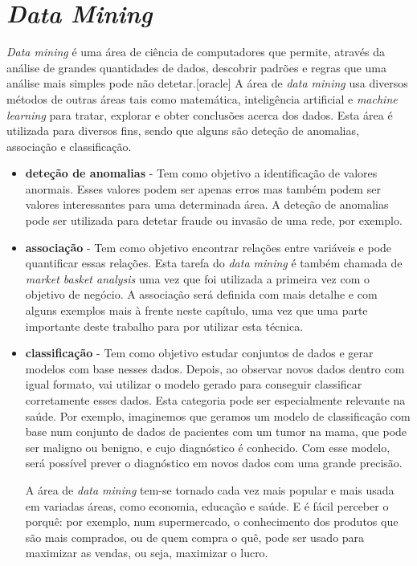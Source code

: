 \section{\textit{Data Mining}}

\textit{Data mining} é uma área de ciência de computadores que permite, através da análise de grandes quantidades de dados, descobrir padrões e regras que uma análise mais simples pode não detetar.[oracle]
A área de \textit{data mining} usa diversos métodos de outras áreas tais como matemática, inteligência artificial e \textit{machine learning} para tratar, explorar e obter conclusões acerca dos dados. Esta área é utilizada para diversos fins, sendo que alguns são deteção de anomalias, associação e classificação. 

\begin{itemize}

\item{\textbf{deteção de anomalias}} - 
Tem como objetivo a identificação de valores anormais. Esses valores podem ser apenas erros mas também podem ser valores interessantes para uma determinada área. A deteção de anomalias pode ser utilizada para detetar fraude ou invasão de uma rede, por exemplo.

\item{\textbf{associação}} - 
Tem como objetivo encontrar relações entre variáveis e pode quantificar essas relações. Esta tarefa do \textit{data mining} é também chamada de \textit{market basket analysis} uma vez que foi utilizada a primeira vez com o objetivo de negócio. A associação será definida com mais detalhe e com alguns exemplos mais à frente neste capítulo, uma vez que uma parte importante deste trabalho para por utilizar esta técnica. 

\item{\textbf{classificação}} - 
Tem como objetivo estudar conjuntos de dados e gerar modelos com base nesses dados. Depois, ao observar novos dados dentro com igual formato, vai utilizar o modelo gerado para conseguir classificar corretamente esses dados. Esta categoria pode ser especialmente relevante na saúde. Por exemplo, imaginemos que geramos um modelo de classificação com base num conjunto de dados de pacientes com um tumor na mama, que pode ser maligno ou benigno, e cujo diagnóstico é conhecido. Com esse modelo, será possível prever o diagnóstico em novos dados com uma grande precisão. 

A área de \textit{data mining} tem-se tornado cada vez mais popular e mais usada em variadas áreas, como economia, educação e saúde. E é fácil perceber o porquê: por exemplo, num supermercado, o conhecimento dos produtos que são mais comprados, ou de quem compra o quê, pode ser usado para maximizar as vendas, ou seja, maximizar o lucro. 

\end{itemize}
